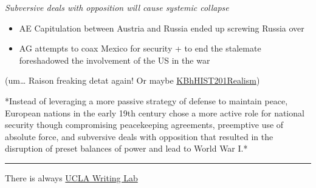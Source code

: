 \documentclass[letterpaper]{article}
\begin{document}
\emph{Subversive deals with opposition will cause systemic collapse}

\begin{itemize}
\item AE Capitulation between Austria and Russia ended up screwing Russia
over
\item AG attempts to coax Mexico for security + to end the stalemate
foreshadowed the involvement of the US in the war
\end{itemize}

(um\ldots{} Raison freaking detat again! Or maybe
\href{KBhHIST201Realism.org}{KBhHIST201Realism})

*Instead of leveraging a more passive strategy of defense to maintain
peace, European nations in the early 19th century chose a more active
role for national security though compromising peacekeeping agreements,
preemptive use of absolute force, and subversive deals with opposition
that resulted in the disruption of preset balances of power and lead to
World War I.*

\noindent\rule{\textwidth}{0.5pt}

There is always
\href{https://wp.ucla.edu/wp-content/uploads/2016/01/UWC\_handouts\_What-How-So-What-Thesis-revised-5-4-15-RZ.pdf}{UCLA
Writing Lab}
\end{document}
